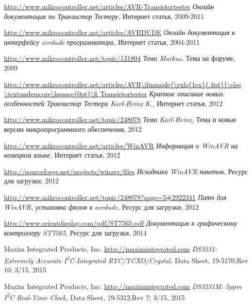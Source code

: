 \documentclass[12pt,a4paper,oneside,english]{report}
\DeclareRobustCommand{\_}{\ifmmode{\rule{1ex}{.4pt}}\else \textunderscore\hspace{0pt}\fi}
\begin{document}
\begin{thebibliography}{99}
\url{http://www.mikrocontroller.net/articles/AVR-Transistortester}
\emph{Онлайн документация по Транзистор Тестеру,}
Интернет статья,
2009-2011

\url{http://www.mikrocontroller.net/articles/AVRDUDE}
\emph{Онлайн документация к интерфейсу avrdude программатора,}
Интернет статья,
2004-2011

\url{http://www.mikrocontroller.net/topic/131804}
\emph{Тема Markus,}
Тема на форуме, 
2009

\url{http://www.mikrocontroller.net/articles/AVR\_Transistortester}
\emph{Краткое описание новых особенностей Транзистор Тестера Karl-Heinz K.,}
Интернет статья,
2012

\url{http://www.mikrocontroller.net/topic/248078}
\emph{Тема Karl-Heinz,}
Тема и новые версии микропрограммного обеспечения,
2012

\url{http://www.mikrocontroller.net/articles/WinAVR}
\emph{Информация о WinAVR на немецком языке,}
Интернет статья,
2012

\url{http://sourceforge.net/projects/winavr/files}
\emph{Исходники WinAVR пакетов,}
Ресурс для загрузки,
2012

\url{http://www.mikrocontroller.net/topic/248078?page=5#2922341}
\emph{Патч для WinAVR, установка фюзов в avrdude,}
Ресурс для загрузки,
2012

\url{http://www.orientdisplay.com/pdf/ST7565.pdf}
\emph{Документация к графическому контроллеру ST7565,}
Ресурс для загрузки,
2014

Maxim Integrated Products, Inc.
\url{http://maximintegrated.com}
\emph{DS3231: Extremely Accurate I\textsuperscript{2}C-Integrated RTC/TCXO/Crystal,}
Data Sheet,
19-5170;Rev 10; 3/15,
2015

Maxim Integrated Products, Inc.
\url{http://maximintegrated.com}
\emph{DS3231M: 5ppm I\textsuperscript{2}C Real-Time Clock,}
Data Sheet,
19-5312;Rev 7; 3/15,
2015


\end{thebibliography}
\end{document}
